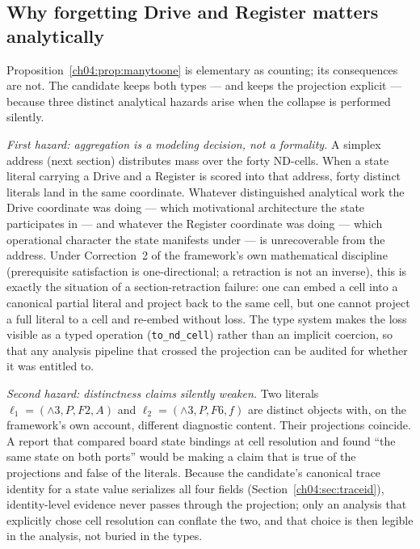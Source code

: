 \subsection{Why forgetting Drive and Register matters analytically}
\label{ch04:sec:whyforget}

Proposition~\ref{ch04:prop:manytoone} is elementary as counting; its
consequences are not. The candidate keeps both types --- and keeps the
projection explicit --- because three distinct analytical hazards arise
when the collapse is performed silently.

\emph{First hazard: aggregation is a modeling decision, not a
formality.} A simplex address (next section) distributes mass over the
forty ND-cells. When a state literal carrying a Drive and a Register is
scored into that address, forty distinct literals land in the same
coordinate. Whatever distinguished analytical work the Drive coordinate was
doing --- which motivational architecture the state participates in --- and
whatever the Register coordinate was doing --- which operational character
the state manifests under --- is unrecoverable from the address. Under
Correction~2 of the framework's own mathematical discipline (prerequisite
satisfaction is one-directional; a retraction is not an inverse), this is
exactly the situation of a section-retraction failure: one can embed a cell
into a canonical partial literal and project back to the same cell, but one
cannot project a full literal to a cell and re-embed without loss. The type
system makes the loss visible as a typed operation
(\texttt{to\_nd\_cell}) rather than an implicit coercion, so that any
analysis pipeline that crossed the projection can be audited for whether it
was entitled to.

\emph{Second hazard: distinctness claims silently weaken.} Two literals
$\ell_1 = ({\wedge}3, P, F2, A)$ and $\ell_2 = ({\wedge}3, P, F6, f)$ are
distinct objects with, on the framework's own account, different
diagnostic content. Their projections coincide. A report that compared
board state bindings at cell resolution and found ``the same state on both
ports'' would be making a claim that is true of the projections and false
of the literals. Because the candidate's canonical trace identity for a
state value serializes all four fields (Section~\ref{ch04:sec:traceid}),
identity-level evidence never passes through the projection; only an
analysis that explicitly chose cell resolution can conflate the two, and
that choice is then legible in the analysis, not buried in the types.

